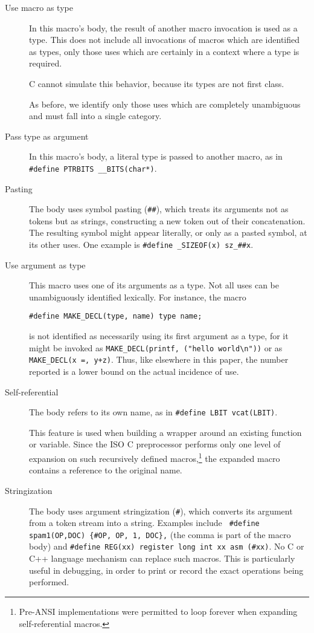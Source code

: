 \begin{description}
\item[Use macro as type]
  In this macro's body, the result of another macro invocation is used as a
  type.  This does not include all invocations of macros which are
  identified as types, only those uses which are certainly in a context
  where a type is required.

  C cannot simulate this behavior, because its types are not first class.

  As before, we identify only those uses which are completely unambiguous
  and must fall into a single category.  

\item[Pass type as argument]
  In this macro's body, a literal type is passed to
  another macro, as in {\tt \#define PTRBITS \verb|__BITS|(char*)}.

\item[Pasting]
  The body uses symbol pasting ({\tt \#\#}), which treats its arguments not
  as tokens but as strings, constructing a new token out of their
  concatenation.  The resulting symbol might appear literally, or only as a
  pasted symbol, at its other uses.  One example is {\tt \#define
  \verb|_SIZEOF|(x) \verb|sz_|\#\#x}.


\item[Use argument as type]
  This macro uses one of its arguments as a type.  Not all uses can be
  unambiguously identified lexically.  For instance, the macro 
\begin{verbatim}
#define MAKE_DECL(type, name) type name;
\end{verbatim}
  is not identified as necessarily using its first argument as a type, for
  it might be invoked as {\tt \verb|MAKE_DECL|(printf, ("hello
  world\verb|\|n"))} or as {\tt \verb|MAKE_DECL|(x =, y+z)}.  Thus, like
elsewhere in this paper, the number reported is a lower bound on the actual
incidence of use.

\item[Self-referential]
  The body refers to its own name, as in
  {\tt \#define LBIT vcat(LBIT)}.
  
  This feature is used when building a wrapper around an existing function
  or variable.  Since the ISO C preprocessor performs only one level of
  expansion on such recursively defined macros,\footnote{Pre-ANSI
    implementations were permitted to loop forever when expanding
    self-referential macros.} the expanded macro contains a reference to
  the original name.

\item[Stringization]
  The body uses argument stringization ({\tt \#}), which converts its
  argument from a token stream into a string.  Examples include {\tt
  \#define spam1(OP,DOC) \verb|{|\#OP, OP, 1, DOC\verb|}|,} (the comma is
part of the macro body) and {\tt \#define REG(xx) register long int xx asm
(\#xx)}.  No C or C++ language mechanism can replace such macros.  This is
  particularly useful in debugging, in order to print or record the exact
  operations being performed.

\end{description}

